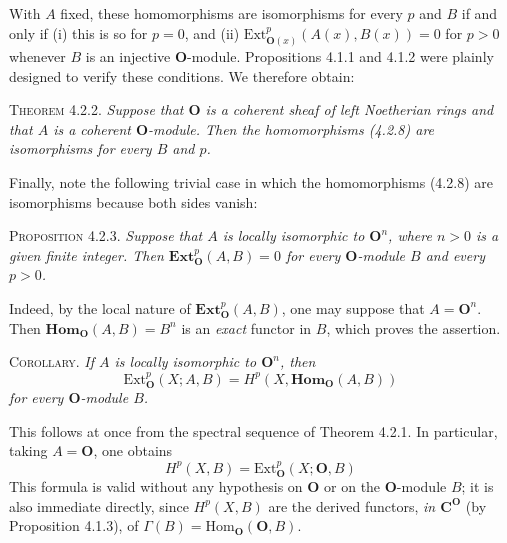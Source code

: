 \clearpage
{}

With $A$ fixed, these homomorphisms are isomorphisms for every $p$ and $B$ if
and only if (i) this is so for $p=0$, and (ii)
$\mathrm{Ext}_{{\mathbf O}(x)}^p(A(x),B(x))=0$ for $p>0$ whenever $B$ is an injective
${\mathbf O}$-module. Propositions 4.1.1 and 4.1.2 were plainly designed to verify these
conditions. We therefore obtain:

\textsc{Theorem 4.2.2.} \textit{Suppose that ${\mathbf O}$ is a coherent sheaf
of left Noetherian rings and that $A$ is a coherent ${\mathbf O}$-module. Then the
homomorphisms \textup{(4.2.8)} are isomorphisms for every $B$ and $p$.}

Finally, note the following trivial case in which the homomorphisms (4.2.8)
are isomorphisms because both sides vanish:

\textsc{Proposition 4.2.3.} \textit{Suppose that $A$ is locally
isomorphic to ${\mathbf O}^n$, where $n>0$ is a given finite integer. Then
$\mathbf{Ext}_{\mathbf O}^p(A,B)=0$ for every ${\mathbf O}$-module $B$ and every $p>0$.}

Indeed, by the local nature of $\mathbf{Ext}_{\mathbf O}^p(A,B)$, one may suppose that
$A={\mathbf O}^n$. Then $\mathbf{Hom}_{\mathbf O}(A,B)=B^n$ is an \textit{exact} functor in $B$, which
proves the assertion.

\textsc{Corollary.} \textit{If $A$ is locally isomorphic to ${\mathbf O}^n$,
then}
\[
\mathrm{Ext}_{\mathbf O}^p(X;A,B)=H^p(X,\mathbf{Hom}_{\mathbf O}(A,B))
\]
\textit{for every ${\mathbf O}$-module $B$.}

This follows at once from the spectral sequence of Theorem 4.2.1. In
particular, taking $A={\mathbf O}$, one obtains
\[
\tag{4.2.9}
H^p(X,B)=\mathrm{Ext}_{\mathbf O}^p(X;{\mathbf O},B)
\]
This formula is valid without any hypothesis on ${\mathbf O}$ or on the ${\mathbf O}$-module $B$;
it is also immediate directly, since $H^p(X,B)$ are the derived functors,
\textit{in $\mathbf C^{\mathbf O}$} (by Proposition 4.1.3), of
$\Gamma(B)=\mathrm{Hom}_{\mathbf O}({\mathbf O},B)$.

